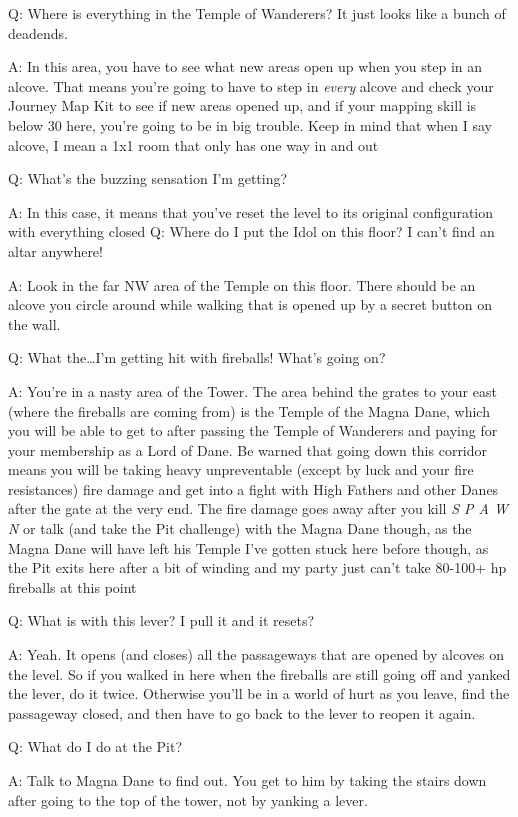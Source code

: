 \documentclass[12pt]{article}
\begin{document}
Q: Where is everything in the Temple of Wanderers? It just looks like a
bunch of deadends.

A: In this area, you have to see what new areas open up when you step in
an alcove. That means you're going to have to step in \emph{every}
alcove and check your Journey Map Kit to see if new areas opened up, and
if your mapping skill is below 30 here, you're going to be in big
trouble. Keep in mind that when I say alcove, I mean a 1x1 room that
only has one way in and out

Q: What's the buzzing sensation I'm getting?

A: In this case, it means that you've reset the level to its original
configuration with everything closed Q: Where do I put the Idol on this
floor? I can't find an altar anywhere!

A: Look in the far NW area of the Temple on this floor. There should be
an alcove you circle around while walking that is opened up by a secret
button on the wall.

Q: What the\ldots{}I'm getting hit with fireballs! What's going on?

A: You're in a nasty area of the Tower. The area behind the grates to
your east (where the fireballs are coming from) is the Temple of the
Magna Dane, which you will be able to get to after passing the Temple of
Wanderers and paying for your membership as a Lord of Dane. Be warned
that going down this corridor means you will be taking heavy
unpreventable (except by luck and your fire resistances) fire damage and
get into a fight with High Fathers and other Danes after the gate at the
very end. The fire damage goes away after you kill \emph{S P A W N} or
talk (and take the Pit challenge) with the Magna Dane though, as the
Magna Dane will have left his Temple I've gotten stuck here before
though, as the Pit exits here after a bit of winding and my party just
can't take 80-100+ hp fireballs at this point

Q: What is with this lever? I pull it and it resets?

A: Yeah. It opens (and closes) all the passageways that are opened by
alcoves on the level. So if you walked in here when the fireballs are
still going off and yanked the lever, do it twice. Otherwise you'll be
in a world of hurt as you leave, find the passageway closed, and then
have to go back to the lever to reopen it again.

Q: What do I do at the Pit?

A: Talk to Magna Dane to find out. You get to him by taking the stairs
down after going to the top of the tower, not by yanking a lever.
\end{document}
